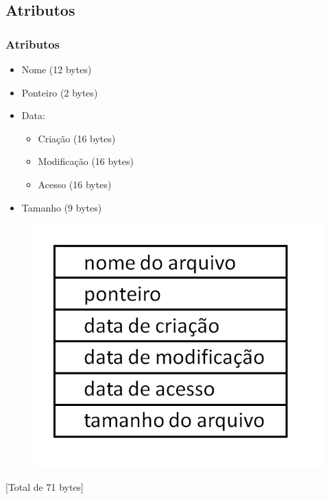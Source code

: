 \documentclass{beamer}
\begin{document}
\subsection{Atributos}
\begin{frame}
\frametitle{Atributos}
\begin{multicols}{2}

\begin{itemize}
\item Nome (12 bytes)  
\item Ponteiro (2 bytes)
\item Data: 
	\begin{itemize}
	\item Criação (16 bytes)
	\item Modificação (16 bytes)
	\item Acesso (16 bytes)
	\end{itemize}
\item Tamanho (9 bytes)
\end{itemize}

\begin{figure}
	\includegraphics[scale=0.35, right]{estruturadirpng.png}
\end{figure}
\justifying
\end{multicols}

\begin{center}
[Total de 71 bytes]
\end{center}

\end{frame}
\end{document}
